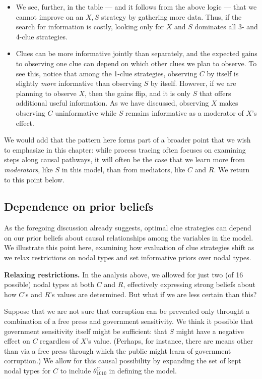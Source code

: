 \documentclass[
  12pt,
]{book}
\begin{document}
\begin{itemize}
\item
  We see, further, in the table --- and it follows from the above logic --- that we cannot improve on an \(X, S\) strategy by gathering more data. Thus, if the search for information is costly, looking only for \(X\) and \(S\) dominates all 3- and 4-clue strategies.
\item
  Clues can be more informative jointly than separately, and the expected gains to observing one clue can depend on which other clues we plan to observe. To see this, notice that among the 1-clue strategies, observing \(C\) by itself is slightly \emph{more} informative than observing \(S\) by itself. However, if we are planning to observe \(X\), then the gains flip, and it is only \(S\) that offers additional useful information. As we have discussed, observing \(X\) makes observing \(C\) uninformative while \(S\) remains informative as a moderator of \(X\)'s effect.
\end{itemize}

We would add that the pattern here forms part of a broader point that we wish to emphasize in this chapter: while process tracing often focuses on examining steps along causal pathways, it will often be the case that we learn more from \emph{moderators}, like \(S\) in this model, than from mediators, like \(C\) and \(R\). We return to this point below.

\hypertarget{dependence-on-prior-beliefs}{%
\subsection{Dependence on prior beliefs}\label{dependence-on-prior-beliefs}}

As the foregoing discussion already suggests, optimal clue strategies can depend on our prior beliefs about causal relationships among the variables in the model. We illustrate this point here, examining how evaluation of clue strategies shift as we relax restrictions on nodal types and set informative priors over nodal types.

\textbf{Relaxing restrictions.} In the analysis above, we allowed for just two (of 16 possible) nodal types at both \(C\) and \(R\), effectively expressing strong beliefs about how \(C\)'s and \(R\)'s values are determined. But what if we are less certain than this?

Suppose that we are not sure that corruption can be prevented only throught a combination of a free press and government sensitivity. We think it possible that government sensitivity itself might be sufficient: that \(S\) might have a negative effect on \(C\) regardless of \(X\)'s value. (Perhaps, for instance, there are means other than via a free press through which the public might learn of government corruption.) We allow for this causal possibility by expanding the set of kept nodal types for \(C\) to include \(\theta^C_{1010}\) in defining the model.
\end{document}
